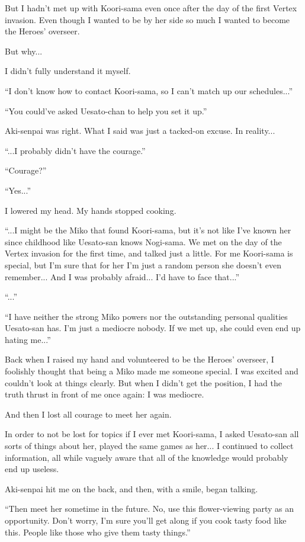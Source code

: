 But I hadn't met up with Koori-sama even once after the day of the first Vertex invasion. Even though I wanted to be by her side so much I wanted to become the Heroes' overseer.

But why...

I didn't fully understand it myself.

``I don't know how to contact Koori-sama, so I can't match up our schedules...''

``You could've asked Uesato-chan to help you set it up.''

Aki-senpai was right. What I said was just a tacked-on excuse. In reality...

``...I probably didn't have the courage.''

``Courage?''

``Yes...''

I lowered my head. My hands stopped cooking.

``...I might be the Miko that found Koori-sama, but it's not like I've known her since childhood like Uesato-san knows Nogi-sama. We met on the day of the Vertex invasion for the first time, and talked just a little. For me Koori-sama is special, but I'm sure that for her I'm just a random person she doesn't even remember... And I was probably afraid... I'd have to face that...''

``...''

``I have neither the strong Miko powers nor the outstanding personal qualities Uesato-san has. I'm just a mediocre nobody. If we met up, she could even end up hating me...''

Back when I raised my hand and volunteered to be the Heroes' overseer, I foolishly thought that being a Miko made me someone special. I was excited and couldn't look at things clearly. But when I didn't get the position, I had the truth thrust in front of me once again: I was mediocre.

And then I lost all courage to meet her again.

In order to not be lost for topics if I ever met Koori-sama, I asked Uesato-san all sorts of things about her, played the same games as her... I continued to collect information, all while vaguely aware that all of the knowledge would probably end up useless.

Aki-senpai hit me on the back, and then, with a smile, began talking.

``Then meet her sometime in the future. No, use this flower-viewing party as an opportunity. Don't worry, I'm sure you'll get along if you cook tasty food like this. People like those who give them tasty things.''

